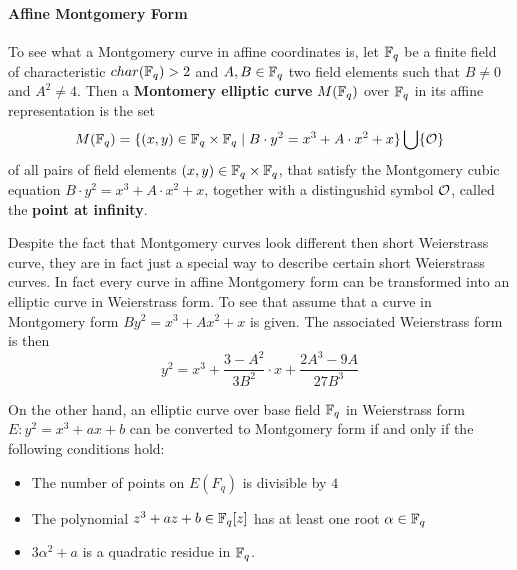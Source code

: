 \paragraph{Affine Montgomery Form}
To see what a Montgomery curve in affine coordinates is, let $\mathbb{F}_q$ be a finite field of characteristic $char(\mathbb{F}_q)>2$ and $A,B\in \mathbb{F}_q$ two field elements such that $B\neq 0$ and $A^2 \neq 4$. Then a \textbf{Montomery elliptic curve} $M(\mathbb{F}_q)$ over $\mathbb{F}_q$ in its affine representation is the set
\begin{equation}
\label{def_short_weierstrass_curve}
M(\mathbb{F}_q) = \{(x,y)\in \mathbb{F}_q\times \mathbb{F}_q\;|\; B\cdot y^2 = x^3 + A\cdot x^2 + x  \} \bigcup \{\mathcal{O}\}
\end{equation}
of all pairs of field elements $(x,y)\in \mathbb{F}_q\times \mathbb{F}_q$, that satisfy the Montgomery cubic equation $B\cdot y^2 = x^3 + A\cdot x^2 + x$, together with a distingushid symbol $\mathcal{O}$, called the \textbf{point at infinity}.

Despite the fact that Montgomery curves look different then short Weierstrass curve, they are in fact just a special way to describe certain short Weierstrass curves. In fact every curve in affine Montgomery form can be transformed into an elliptic curve in Weierstrass form. To see that assume that a curve in Montgomery form $B y^2 = x^3 + A x^2 + x$ is given. The associated Weierstrass form is then
$$
y^2 = x^3 + \frac{3-A^2}{3B^2}\cdot x + \frac{2A^3-9A}{27B^3}
$$
 
On the other hand, an elliptic curve over base field $\mathbb{F}_q$ in Weierstrass form $E: y^2 = x^3 + a x + b$ can be converted to Montgomery form if and only if the following conditions hold:
\begin{itemize}
\item The number of points on $E(F_q)$ is divisible by $4$
\item The polynomial $z^3 + a z + b \in \mathbb{F}_q[z]$ has at least one root $\alpha\in\mathbb{F}_q$
\item $3\alpha^2 + a$ is a quadratic residue in $\mathbb{F}_q$.
\end{itemize}

